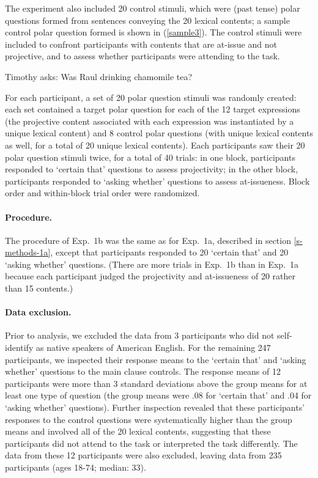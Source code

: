 \documentclass[11pt,fleqn]{article}
\newcommand{\6}{\mbox{$[\hspace*{-.6mm}[$}}
\newcommand{\9}{\mbox{$]\hspace*{-.6mm}]$}}
\begin{document}
The experiment also included 20 control stimuli, which were (past tense) polar questions formed from sentences conveying the 20 lexical contents; a sample control polar question formed is shown in (\ref{sample3}). The control stimuli were included to confront participants with contents that are at-issue and not projective, and to assess whether participants were attending to the task.

\begin{exe}
\ex\label{sample3} Timothy asks: Was Raul drinking chamomile tea?
\end{exe}

For each participant, a set of 20 polar question stimuli was randomly created: each set contained a target polar question for each of the 12 target expressions (the projective content associated with each expression was instantiated by a unique lexical content) and 8 control polar questions (with unique lexical contents as well, for a total of 20 unique lexical contents). Each participants saw their 20 polar question stimuli twice, for a total of 40 trials: in one block, participants responded to `certain that' questions to assess projectivity; in the other block, participants responded to `asking whether' questions to assess at-issueness. Block order and within-block trial order were randomized.

\paragraph{Procedure.} The procedure of Exp.~1b was the same as for Exp.~1a, described in section \ref{s-methods-1a}, except that participants responded to 20 `certain that' and 20 `asking whether' questions. (There are more trials in Exp.~1b than in Exp.~1a because each participant judged the projectivity and at-issueness of 20  rather than 15 contents.)


\paragraph{Data exclusion.} Prior to analysis, we excluded the data from 3 participants who did not self-identify as native speakers of American English. For the remaining 247 participants, we inspected their response means to the `certain that' and `asking whether' questions to the main clause controls. The response means of 12 participants were more than 3 standard deviations above the group means for at least one type of question (the group means were .08 for `certain that' and .04 for `asking whether' questions). Further inspection revealed that these participants' responses to the control questions were systematically higher than the group means and involved all of the 20 lexical contents, suggesting that these participants did not attend to the task or interpreted the task differently. The data from these 12 participants were also excluded, leaving data from 235 participants (ages 18-74; median: 33).
\end{document}
